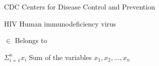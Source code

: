 \begin{siglas}
    \item[CDC] Centers for Disease Control and Prevention
    \item[HIV] Human immunodeficiency virus  
  \end{siglas}
  
  \begin{simbolos}
    \item[$\in$] Belongs to 
    \item[$\Sigma_{i=1}^n x_i$] Sum of the variables $x_1, x_2, \dots, x_n$
  \end{simbolos}
